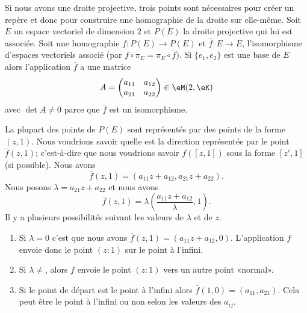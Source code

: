 \begin{normaltext}
	Si nous avons une droite projective, trois points sont nécessaires pour créer un repère et donc pour construire une homographie de la droite sur elle-même. Soit \( E\) un espace vectoriel de dimension \( 2\) et \( P(E)\) la droite projective qui lui est associée. Soit une homographie \( f\colon P(E)\to P(E)\) et \( \bar f\colon E\to E\), l'isomorphisme d'espaces vectoriels associé (par \( f\circ\pi_E=\pi_E\circ \bar f\)). Si \( \{ e_1,e_2 \}\) est une base de \( E\) alors l'application \( \bar f\) a une matrice
	\begin{equation}
		A=\begin{pmatrix}
			a_{11} & a_{12} \\
			a_{21} & a_{22}
		\end{pmatrix}\in \eM(2,\eK)
	\end{equation}
	avec \( \det A\neq 0\) parce que \( \bar f\) est un isomorphisme.

	La plupart des points de \( P(E)\) sont représentés par des points de la forme \( (z,1)\). Nous voudrions savoir quelle est la direction représentée par le point \( \bar f(z,1)\); c'est-à-dire que nous voudrions savoir \( f([z,1])\) sous la forme \( [z',1]\) (si possible). Nous avons
	\begin{equation}
		\bar f(z,1)=(a_{11}z+a_{12},a_{21}z+a_{22}).
	\end{equation}
	Nous posons \( \lambda=a_{21}z+a_{22}\) et nous avons
	\begin{equation}
		\bar f(z,1)=\lambda\left( \frac{ a_{11}z+a_{12} }{ \lambda },1 \right).
	\end{equation}
	Il y a plusieurs possibilités suivant les valeurs de \( \lambda\) et de \( z\).

	\begin{enumerate}
		\item
		      Si \( \lambda=0\) c'est que nous avons \( \bar f(z,1)=(a_{11}z+a_{12},0)\). L'application \( f\) envoie donc le point \( (z:1)\) sur le point à l'infini.
		\item
		      Si \( \lambda\neq \), alors \( f\) envoie le point \( (z:1)\) vers un autre point «normal».
		\item
		      Si le point de départ est le point à l'infini alors \( \bar f(1,0)=(a_{11},a_{21})\). Cela peut être le point à l'infini ou non selon les valeurs des \( a_{ij}\).
	\end{enumerate}


\end{normaltext}
